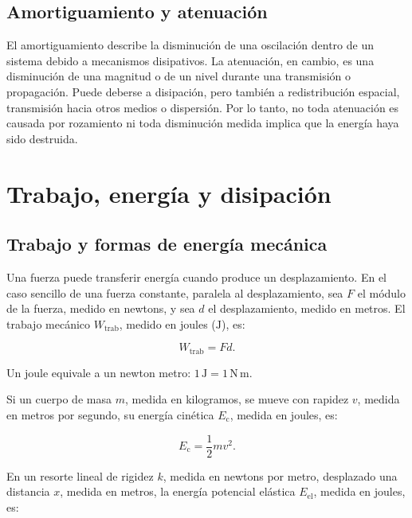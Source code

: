 \subsection{Amortiguamiento y atenuación}
\label{sec:u2-amortiguamiento-atenuacion}

El amortiguamiento describe la disminución de una oscilación dentro de un sistema debido a mecanismos disipativos. La atenuación, en cambio, es una disminución de una magnitud o de un nivel durante una transmisión o propagación. Puede deberse a disipación, pero también a redistribución espacial, transmisión hacia otros medios o dispersión. Por lo tanto, no toda atenuación es causada por rozamiento ni toda disminución medida implica que la energía haya sido destruida.

\section{Trabajo, energía y disipación}
\label{sec:u2-energia}

\subsection{Trabajo y formas de energía mecánica}
\label{sec:u2-trabajo-energia}

Una fuerza puede transferir energía cuando produce un desplazamiento. En el caso sencillo de una fuerza constante, paralela al desplazamiento, sea \(F\) el módulo de la fuerza, medido en newtons, y sea \(d\) el desplazamiento, medido en metros. El trabajo mecánico \(W_\mathrm{trab}\), medido en joules (\(\text{J}\)), es:

\begin{equation}
    W_\mathrm{trab}=Fd.
    \label{eq:u2-trabajo}
\end{equation}

Un joule equivale a un newton metro: \(1\,\text{J}=1\,\text{N}\,\text{m}\).

Si un cuerpo de masa \(m\), medida en kilogramos, se mueve con rapidez \(v\), medida en metros por segundo, su energía cinética \(E_\mathrm{c}\), medida en joules, es:

\begin{equation}
    E_\mathrm{c}=\frac{1}{2}mv^{2}.
    \label{eq:u2-energia-cinetica}
\end{equation}

En un resorte lineal de rigidez \(k\), medida en newtons por metro, desplazado una distancia \(x\), medida en metros, la energía potencial elástica \(E_\mathrm{el}\), medida en joules, es:

